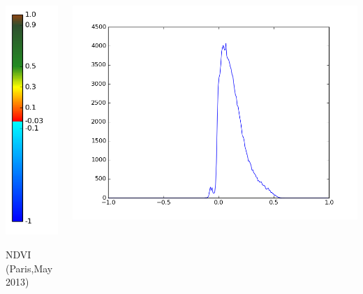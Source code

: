 \documentclass[c]{beamer}
\begin{document}
\begin{frame}
\begin{columns}
\begin{column}{0.33\textwidth}
\begin{overlayarea}{\linewidth}{2cm}
{  \includegraphics[scale=0.13]{images/colormap.png}
  }
  \end{overlayarea}
  \begin{overlayarea}{\linewidth}{0.5cm}
  \centering
  \tiny NDVI (Paris,May 2013) \par
  \end{overlayarea}
 \end{column}
 \begin{column}{0.33\textwidth}
  \begin{overlayarea}{\linewidth}{2cm}
  \centering\vfill
  \includegraphics[scale=0.12]{images/Paris/05_ndvi_histo.png}

\end{overlayarea}
\end{column}
\end{columns}
\end{frame}
\end{document}
